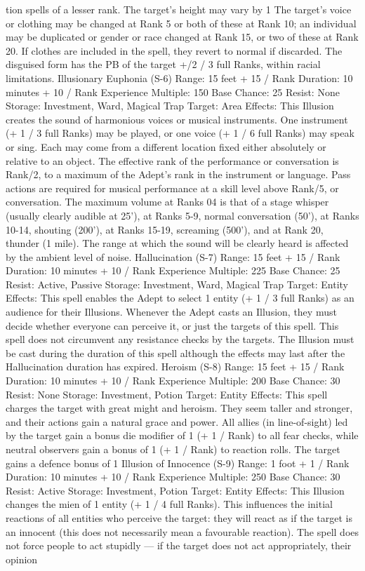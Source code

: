 \documentclass[a4paper]{article}
\begin{document}
\begin{multicols}{3}
tion spells of a lesser rank. The target’s height may
vary by 1%
The target’s voice or clothing may be changed at
Rank 5 or both of these at Rank 10; an individual
may be duplicated or gender or race changed at
Rank 15, or two of these at Rank 20. If clothes are
included in the spell, they revert to normal if discarded. The disguised form has the PB of the target
+/2 / 3 full Ranks, within racial limitations.
Illusionary Euphonia (S-6)
Range: 15 feet + 15 / Rank
Duration: 10 minutes + 10 / Rank
Experience Multiple: 150
Base Chance: 25%
Resist: None
Storage: Investment, Ward, Magical Trap
Target: Area
Effects: This Illusion creates the sound of harmonious voices or musical instruments. One instrument (+ 1 / 3 full Ranks) may be played, or one
voice (+ 1 / 6 full Ranks) may speak or sing. Each
may come from a different location fixed either
absolutely or relative to an object. The effective
rank of the performance or conversation is Rank/2,
to a maximum of the Adept’s rank in the instrument or language. Pass actions are required for
musical performance at a skill level above Rank/5,
or conversation. The maximum volume at Ranks 04 is that of a stage whisper (usually clearly audible
at 25’), at Ranks 5-9, normal conversation (50’), at
Ranks 10-14, shouting (200’), at Ranks 15-19,
screaming (500’), and at Rank 20, thunder (1 mile).
The range at which the sound will be clearly heard
is affected by the ambient level of noise.
Hallucination (S-7)
Range: 15 feet + 15 / Rank
Duration: 10 minutes + 10 / Rank
Experience Multiple: 225
Base Chance: 25%
Resist: Active, Passive
Storage: Investment, Ward, Magical Trap
Target: Entity
Effects: This spell enables the Adept to select 1
entity (+ 1 / 3 full Ranks) as an audience for their
Illusions. Whenever the Adept casts an Illusion,
they must decide whether everyone can perceive it,
or just the targets of this spell. This spell does not
circumvent any resistance checks by the targets.
The Illusion must be cast during the duration of
this spell although the effects may last after the
Hallucination duration has expired.
Heroism (S-8)
Range: 15 feet + 15 / Rank
Duration: 10 minutes + 10 / Rank
Experience Multiple: 200
Base Chance: 30%
Resist: None
Storage: Investment, Potion
Target: Entity
Effects: This spell charges the target with great
might and heroism. They seem taller and stronger,
and their actions gain a natural grace and power.
All allies (in line-of-sight) led by the target gain a
bonus die modifier of 1 (+ 1 / Rank) to all fear
checks, while neutral observers gain a bonus of 1
(+ 1 / Rank) to reaction rolls. The target gains a
defence bonus of 1%
Illusion of Innocence (S-9)
Range: 1 foot + 1 / Rank
Duration: 10 minutes + 10 / Rank
Experience Multiple: 250
Base Chance: 30%
Resist: Active
Storage: Investment, Potion
Target: Entity
Effects: This Illusion changes the mien of 1 entity
(+ 1 / 4 full Ranks). This influences the initial
reactions of all entities who perceive the target:
they will react as if the target is an innocent (this
does not necessarily mean a favourable reaction).
The spell does not force people to act stupidly — if
the target does not act appropriately, their opinion


\end{multicols}
\end{document}
